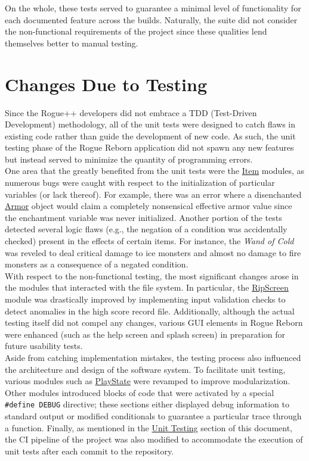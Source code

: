 \documentclass[12pt, titlepage]{article}
\newcommand{\newsection}[1]{\newpage\section{#1}}
\begin{document}
	On the whole, these tests served to guarantee a minimal level of functionality for each documented feature across the builds.  Naturally, the suite did not consider the non-functional requirements of the project since these qualities lend themselves better to manual testing.  

\newsection{Changes Due to Testing} \label{Section_Changes}
	Since the Rogue++ developers did not embrace a TDD (Test-Driven Development) methodology, all of the unit tests were designed to catch flaws in existing code rather than guide the development of new code.  As such, the  unit testing phase of the Rogue Reborn application did not spawn any new features but instead served to minimize the quantity of programming errors.\\

	One area that the greatly benefited from the unit tests were the \hyperref[Section_M_Trace]{Item} modules, as numerous bugs were caught with respect to the initialization of particular variables (or lack thereof).  For example, there was an error where a disenchanted \hyperref[Section_M_Trace]{Armor} object would claim a completely nonsensical effective armor value since the enchantment variable was never initialized.  Another portion of the tests detected several logic flaws (e.g., the negation of a condition was accidentally checked) present in the effects of certain items.  For instance, the \textit{Wand of Cold} was reveled to deal critical damage to ice monsters and almost no damage to fire monsters as a consequence of a negated condition.\\

	With respect to the non-functional testing, the most significant changes arose in the modules that interacted with the file system.  In particular, the \hyperref[Section_M_Trace]{RipScreen} module was drastically improved by implementing input validation checks to detect anomalies in the high score record file.  Additionally, although the actual testing itself did not compel any changes, various GUI elements in Rogue Reborn were enhanced (such as the help screen and splash screen) in preparation for future usability tests.\\

	Aside from catching implementation mistakes, the testing process also influenced the architecture and design of the software system.  To facilitate unit testing, various modules such as \hyperref[Section_M_Trace]{PlayState} were revamped to improve modularization.  Other modules introduced blocks of code that were activated by a special \lstinline$#define DEBUG$ directive; these sections either displayed debug information to standard output or modified conditionals to guarantee a particular trace through a function.  Finally, as mentioned in the \hyperref[Section_UT]{Unit Testing} section of this document, the CI pipeline of the project was also modified to accommodate the execution of unit tests after each commit to the repository.
\end{document}
